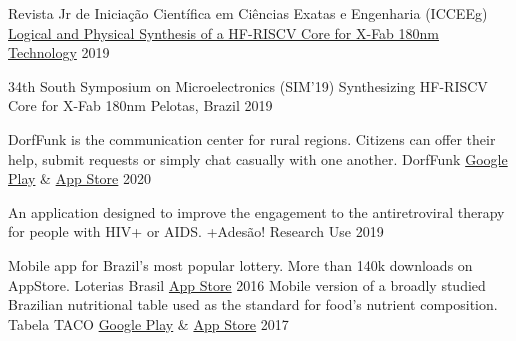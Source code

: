
\begin{cventries}


    \cvcompactentry
    { Revista Jr de Iniciação Científica em Ciências Exatas e Engenharia (ICCEEg)}
    {\href{http://download.c3.furg.br/components/download_categoria/baixar.php?arquivo=e4873aa9a05cc5ed839561d121516766}{Logical and Physical Synthesis of a HF-RISCV Core for X-Fab 180nm Technology}}
    {}
    {2019}

  \cvcompactentry
    {34th South Symposium on Microelectronics (SIM'19)}
    {Synthesizing HF-RISCV Core for X-Fab 180nm}
    {Pelotas, Brazil}
    {2019}
\end{cventries}


\begin{cventries}

  \cvcompactentry
    {DorfFunk is the communication center for rural regions. Citizens can offer their help, submit requests or simply chat casually with one another.}
    {DorfFunk}
    {\href{https://play.google.com/store/apps/details?id=de.fhg.iese.dd.dorffunk.android&hl=pt_BR&gl=US}{Google Play} \& \href{https://apps.apple.com/app/id1348748008}{App Store} }
    {2020}

    \cvcompactentry
    {An application designed to improve the engagement to the antiretroviral therapy for people with HIV+ or AIDS.}
    {+Adesão!}
    {Research Use}
    {2019}

  \cvcompactentry
    {Mobile app for Brazil’s most popular lottery. More than 140k downloads on AppStore.}
    {Loterias Brasil}
    {\href{https://apps.apple.com/app/id992505562}{App Store}}
    {2016}
  \cvcompactentry
    {Mobile version of a broadly studied Brazilian nutritional table used as the standard for food’s nutrient composition.}
    {Tabela TACO}
    {\href{https://play.google.com/store/apps/details?id=rodrigo.TabelaTaco&hl=pt_BR&gl=US}{Google Play} \& \href{https://apps.apple.com/app/id1066079092}{App Store} }
    {2017}

\end{cventries}
